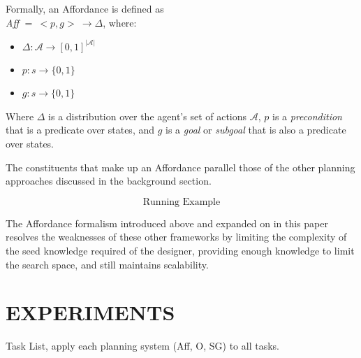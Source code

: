 \documentclass[]{article}
\begin{document}
Formally, an Affordance is defined as \vspace{1 mm} \\
{\it Aff} $ =\ <p,g>\ \longrightarrow \Delta$, where:

\begin{itemize}
\item[] $\Delta : \mathcal{A} \longrightarrow [0,1]^{|\mathcal{A}|}$
\item[] $p : s \longrightarrow \{$0$, 1\}$
\item[] $g : s \longrightarrow \{$0$,1\}$
\end{itemize}

Where $\Delta$ is a distribution over the agent's set of actions $\mathcal{A}$, $p$ is a {\it precondition} that is a predicate over states, and $g$ is a {\it goal} or {\it subgoal} that is also a predicate over states.

The constituents that make up an Affordance parallel those of the other planning approaches discussed in the background section.

\[
\boxed{\text{Running Example}}
\]

The Affordance formalism introduced above and expanded on in this paper resolves the weaknesses of these other frameworks by limiting the complexity of the seed knowledge required of the designer, providing enough knowledge to limit the search space, and still maintains scalability.

\section{EXPERIMENTS}

Task List, apply each planning system (Aff, O, SG) to all tasks.


\end{document}
